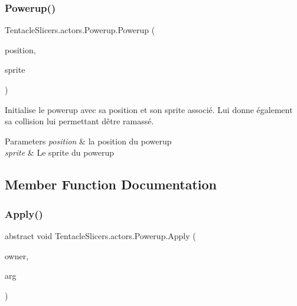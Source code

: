 \subsubsection{\texorpdfstring{Powerup()}{Powerup()}}
{\footnotesize\ttfamily Tentacle\+Slicers.\+actors.\+Powerup.\+Powerup (\begin{DoxyParamCaption}\item[{Point}]{position,  }\item[{\hyperlink{class_tentacle_slicers_1_1graphics_1_1_custom_sprite}{Custom\+Sprite}}]{sprite }\end{DoxyParamCaption})\hspace{0.3cm}{\ttfamily [protected]}}



Initialise le powerup avec sa position et son sprite associé. Lui donne également sa collision lui permettant d\textquotesingle{}être ramassé. 


\begin{DoxyParams}{Parameters}
{\em position} & la position du powerup \\
\hline
{\em sprite} & Le sprite du powerup \\
\hline
\end{DoxyParams}


\subsection{Member Function Documentation}
\mbox{\label{class_tentacle_slicers_1_1actors_1_1_powerup_a65355e6ca82f35ca0d4ff111c03c8eee}} 
\subsubsection{\texorpdfstring{Apply()}{Apply()}}
{\footnotesize\ttfamily abstract void Tentacle\+Slicers.\+actors.\+Powerup.\+Apply (\begin{DoxyParamCaption}\item[{\hyperlink{class_tentacle_slicers_1_1actors_1_1_player_character}{Player\+Character}}]{owner,  }\item[{int}]{arg }\end{DoxyParamCaption})\hspace{0.3cm}{\ttfamily [pure virtual]}}



